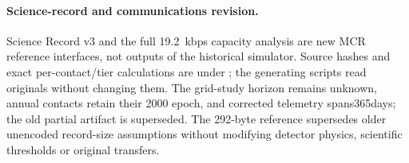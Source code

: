 \paragraph{Science-record and communications revision.}
Science Record v3 and the full 19.2~kbps capacity analysis are new MCR reference interfaces, not outputs of the historical simulator. Source hashes and exact per-contact/tier calculations are under ; the generating scripts read originals without changing them. The grid-study horizon remains unknown, annual contacts retain their 2000 epoch, and corrected telemetry spans365days; the old partial artifact is superseded. The 292-byte reference supersedes older unencoded record-size assumptions without modifying detector physics, scientific thresholds or original transfers.
